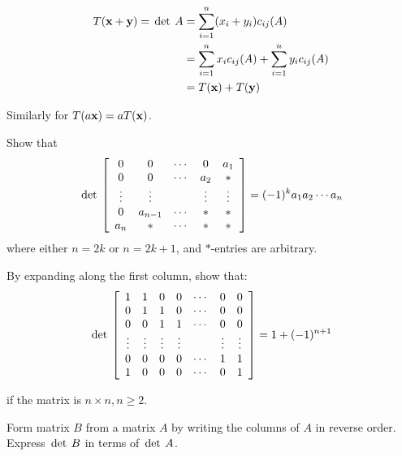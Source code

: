 \begin{multicols}{2}
\begin{ex}
\begin{sol}
\begin{align*}
T(\textbf{x} + \textbf{y}) = \thinspace\operatorname{det \medspace} A &= \sum_{i=1}^{n} (x_i + y_i)c_{ij}(A) \\
&= \sum_{i=1}^{n} x_ic_{ij}(A) + \sum_{i=1}^{n} y_ic_{ij}(A)\\
&= T(\textbf{x}) + T(\textbf{y})
\end{align*}

Similarly for $T(a\textbf{x}) = aT(\textbf{x})$.
\end{sol}
\end{ex}
\columnbreak
\begin{ex}
Show that
\begin{equation*}
\thinspace\operatorname{det\medspace} \left[ \begin{array}{ccccc}
0 & 0 & \cdots & 0 & a_1 \\
0 & 0 & \cdots & a_2 & * \\
\vdots & \vdots & & \vdots & \vdots \\
0 & a_{n-1} & \cdots & * & * \\
a_n & * & \cdots & * & *
\end{array}
\right]
= 
(-1)^k a_1a_2 \cdots a_n
\end{equation*}
where either $n = 2k$ or $n = 2k + 1$, and $*$-entries are arbitrary.
\end{ex}

\begin{ex}
By expanding along the first column, show that:
\begin{equation*}
\thinspace\operatorname{det\medspace} \left[ \begin{array}{ccccccc}
1 & 1 & 0 & 0 & \cdots & 0 & 0 \\
0 & 1 & 1 & 0 & \cdots & 0 & 0 \\
0 & 0 & 1 & 1 & \cdots & 0 & 0 \\
\vdots & \vdots & \vdots & \vdots & & \vdots & \vdots \\
0 & 0 & 0 & 0 & \cdots & 1 & 1 \\
1 & 0 & 0 & 0 & \cdots & 0 & 1 \\
\end{array}
\right]
= 1 + (-1)^{n+1}
 \end{equation*}

if the matrix is $n \times n, n \geq 2$.
\end{ex}

\begin{ex}
Form matrix $B$ from a matrix $A$ by writing the columns of $A$ in reverse order. Express $\thinspace\operatorname{det \medspace} B$ in terms of $\thinspace\operatorname{det \medspace} A$.


\end{ex}
\end{multicols}

